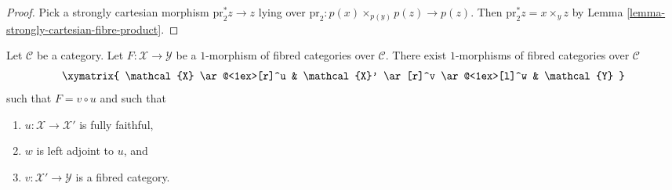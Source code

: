 \begin{proof}
Pick a strongly cartesian morphism
$\text{pr}_2^*z \to z$ lying over
$\text{pr}_2 : p(x) \times_{p(y)} p(z) \to p(z)$. Then
$\text{pr}_2^*z = x \times_y z$ by
Lemma \ref{lemma-strongly-cartesian-fibre-product}.
\end{proof}

\begin{lemma}
\label{lemma-ameliorate-morphism-fibred-categories}
Let $\mathcal{C}$ be a category. Let $F : \mathcal{X} \to \mathcal{Y}$
be a $1$-morphism of fibred categories over $\mathcal{C}$.
There exist $1$-morphisms of fibred categories over $\mathcal{C}$
$$
\xymatrix{
\mathcal{X} \ar@<1ex>[r]^u &
\mathcal{X}' \ar[r]^v \ar@<1ex>[l]^w & \mathcal{Y}
}
$$
such that $F = v \circ u$ and such that
\begin{enumerate}
\item $u : \mathcal{X} \to \mathcal{X}'$ is fully faithful,
\item $w$ is left adjoint to $u$, and
\item $v : \mathcal{X}' \to \mathcal{Y}$ is a fibred category.
\end{enumerate}
\end{lemma}

